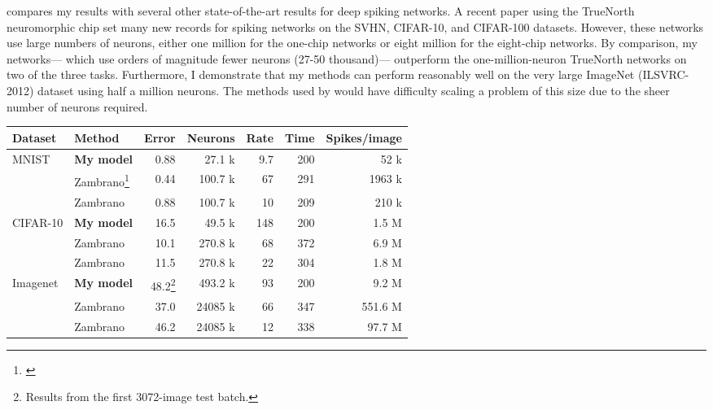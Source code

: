  compares my results
with several other state-of-the-art results for deep spiking networks.
A recent paper using the TrueNorth neuromorphic chip \parencite{Esser2016}
set many new records for spiking networks
on the SVHN, CIFAR-10, and CIFAR-100 datasets.
However, these networks use large numbers of neurons,
either one million for the one-chip networks
or eight million for the eight-chip networks.
By comparison, my networks---%
which use orders of magnitude fewer neurons (27-50 thousand)---%
outperform the one-million-neuron TrueNorth networks
on two of the three tasks.
Furthermore, I demonstrate that my methods can perform reasonably well
on the very large ImageNet (ILSVRC-2012) dataset using half a million neurons.
The methods used by \textcite{Esser2016}
would have difficulty scaling a problem of this size due to the sheer
number of neurons required.


\begin{table}
  \centering
  \begin{minipage}{\columnwidth}
    \begin{center}
      \newcommand{\ratbatch}{\label{ratbatch}Results from the first 3072-image test batch.}
      \newcommand{\hunsa}{\textbf{My model}}
      \newcommand{\hunsb}{\hunsa}
      \newcommand{\zamba}{Zambrano\footnote{\label{zamba}\textcite{Zambrano2017}}}
      \newcommand{\zambb}{Zambrano\footnoteref{zamba}}
      \begin{tabular}{llrrrrr}
        Dataset & Method & Error & Neurons & Rate & Time & Spikes/image \\
        \hline\multirow{3}{*}{MNIST}
            & \hunsa & 0.88 & 27.1 k & 9.7 & 200 & 52 k \\
            & \zamba & 0.44 & 100.7 k & 67 & 291 & 1963 k \\
            & \zambb & 0.88 & 100.7 k & 10 & 209 & 210 k \\
        \hline\multirow{3}{*}{CIFAR-10}
            & \hunsb & 16.5 & 49.5 k & 148 & 200 & 1.5 M \\
            & \zambb & 10.1 & 270.8 k & 68 & 372 & 6.9 M \\
            & \zambb & 11.5 & 270.8 k & 22 & 304 & 1.8 M \\
        \hline\multirow{3}{*}{Imagenet}
            & \hunsb & 48.2\footnote{\ratbatch} & 493.2 k & 93 & 200 & 9.2 M \\
            & \zambb & 37.0 & 24085 k & 66 & 347 & 551.6 M \\
            & \zambb & 46.2 & 24085 k & 12 & 338 & 97.7 M
      \end{tabular}
    \end{center}
  \end{minipage}
\end{table}

